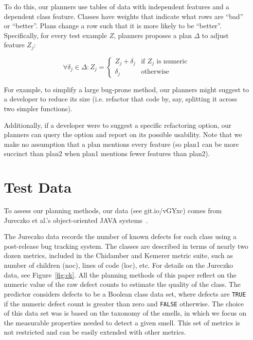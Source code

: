 \documentclass{sig-alternate}
\newcommand{\fig}[1]{Figure~\ref{fig:#1}}
\begin{document}
{\begin{itemize}[leftmargin=3mm]
To do this, our planners use tables of data with independent features and a dependent class feature. Classes have weights  that  indicate  what rows are ``bad'' or ``better''. Plans  change   a row such that it is more likely to be ``better''. Specifically, for every test example $Z$,   planners proposes a  plan $\Delta$ to adjust   feature $Z_j$:

{\small\[
\forall \delta_j \in \Delta :  Z_j =  
\begin{cases}
     Z_j + \delta_j& \text{if $Z_j$ is numeric}\\
    \delta_j              & \text{otherwise}
\end{cases}
\]}

For example, to simplify a  large bug-prone  method, our planners might suggest to a developer to reduce its size (i.e.  refactor that code by, say, splitting it across two simpler functions).

Additionally, if a developer were to suggest a specific refactoring option, our planners can query the option and report on its possible usability. Note that we make no assumption that a plan mentions every feature (so plan1 can be  more succinct than plan2 when plan1  mentions fewer features than plan2).


\section{Test Data}\label{sect:tesd}

To assess our planning methods, our data (see git.io/vGYxc) comes from Jureczko et al.'s object-oriented JAVA systems~\cite{jureczko10}.

The Jureczko data records the number of known defects for each class using a post-release bug tracking system. The classes are described in terms of nearly two dozen metrics, included in the Chidamber and Kemerer metric suite, such as number of children (noc), lines of code (loc), etc. For details on the Jureczko data, see  \fig{ck}. All the planning methods of this paper reflect on the numeric value of the raw defect counts to estimate the quality of the class. The predictor considers defects to be a Boolean class data set, where defects are \texttt{TRUE} if the numeric defect count is greater than zero and \texttt{FALSE} otherwise. The choice of this data set was is based on the taxonomy of the smells, in which we focus on the measurable properties needed to detect a given smell. This set of metrics is not restricted and can be easily extended with other metrics.




\end{itemize}}
\end{document}
